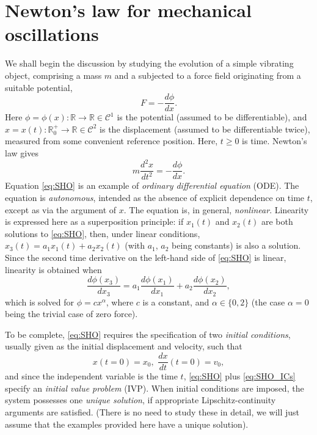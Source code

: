 \documentclass[11pt,twoside,a4paper,english]{book}
\begin{document}
\section{Newton's law for mechanical oscillations}



We shall  begin the discussion by studying the evolution of a simple vibrating object, comprising a mass $m$  and a subjected to a force field originating from a suitable potential, 
\begin{equation}\label{eq:PhiF}
    F = - \frac{d\phi}{dx}.
\end{equation}
Here $\phi = \phi(x): \mathbb{R} \rightarrow \mathbb{R} \in \mathcal{C}^1$ is the potential (assumed to be differentiable), and $x = x(t): \mathbb{R}^+_0 \rightarrow \mathbb{R} \in \mathcal{C}^2$ is the displacement (assumed to be differentiable twice), measured from some convenient reference position. Here, $t \geq 0$ is time. Newton's law gives
\begin{equation}\label{eq:SHO}
    m \frac{d^2 x}{dt^2} = - \frac{d\phi}{dx}.
\end{equation}
Equation \eqref{eq:SHO} is an example of \emph{ordinary differential equation} (ODE). The equation is  \emph{autonomous}, intended as the absence of explicit dependence on time $t$, except as via the argument of $x$. The equation is, in general, \emph{nonlinear}. Linearity is expressed here as a superposition principle: if $x_1(t)$ and $x_2(t)$ are both solutions to \eqref{eq:SHO}, then, under linear conditions, $x_3(t) = a_1 x_1(t) + a_2 x_2(t)$ (with $a_1$, $a_2$ being constants) is also a solution. Since the second time derivative on the left-hand side of \eqref{eq:SHO} is linear, linearity is obtained when
\begin{equation}
    \frac{d\phi(x_3)}{d x_3} = a_1 \frac{d\phi(x_1)}{dx_1} + a_2 \frac{d\phi(x_2)}{dx_2},
\end{equation}
which is solved for $\phi = c x^\alpha$, where $c$ is a constant, and $\alpha \in \{0,2 \}$ (the case $\alpha =0$ being the trivial case of zero force).


To be complete, \eqref{eq:SHO} requires the specification of two \emph{initial conditions}, usually given as the initial displacement and velocity, such that
\begin{equation}\label{eq:SHO_ICs}
    x(t=0) = x_0, \,\, \frac{dx}{dt}(t=0) = v_0,
\end{equation}
and since the independent variable is the time $t$, \eqref{eq:SHO} plus \eqref{eq:SHO_ICs} specify an \emph{initial value problem} (IVP). When initial conditions are imposed, the system possesses one \emph{unique solution}, if appropriate Lipschitz-continuity arguments are satisfied. (There is no need to study these in detail, we will just assume that the examples provided here have a unique solution). 
\end{document}
